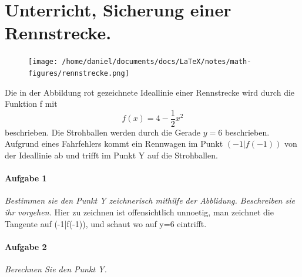 \documentclass{report}
\begin{document}
\section{Unterricht, Sicherung einer Rennstrecke.}

\begin{figure}[htpb]
  \begin{center}
    \texttt{[image: /home/daniel/documents/docs/LaTeX/notes/math-figures/rennstrecke.png]}
  \end{center}
\end{figure}

Die in der Abbildung rot gezeichnete Ideallinie einer Rennstrecke wird durch
die Funktion f mit 
\[ f(x)=4-\frac{1}{2}x^2\]
beschrieben. Die Strohballen werden durch die Gerade $y=6$ beschrieben.
Aufgrund eines Fahrfehlers kommt ein Rennwagen im Punkt $(-1|f(-1))$ von der
Ideallinie ab und trifft im Punkt Y auf die Strohballen.

\paragraph{Aufgabe 1} \textit{Bestimmen sie den Punkt Y zeichnerisch mithilfe der Abblidung. Beschreiben sie ihr vorgehen.}
Hier zu zeichnen ist offensichtlich unnoetig, man zeichnet die Tangente auf (-1|f(-1)), und schaut wo auf y=6 eintrifft.


\paragraph{Aufgabe 2} \textit{Berechnen Sie den Punkt Y.}
\end{document}
